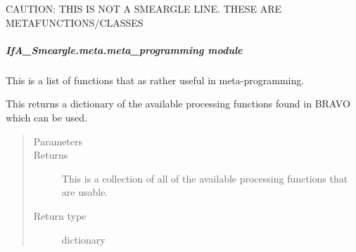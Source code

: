 \documentclass[letterpaper,10pt,english]{sphinxmanual}
\begin{document}
CAUTION: THIS IS NOT A SMEARGLE LINE. THESE ARE METAFUNCTIONS/CLASSES


\subparagraph{IfA\_Smeargle.meta.meta\_programming module}
\label{\detokenize{python_docstrings/IfA_Smeargle.meta.meta_programming:module-IfA_Smeargle.meta.meta_programming}}\label{\detokenize{python_docstrings/IfA_Smeargle.meta.meta_programming:ifa-smeargle-meta-meta-programming-module}}\label{\detokenize{python_docstrings/IfA_Smeargle.meta.meta_programming::doc}}
This is a list of functions that as rather useful in meta-programming.

\begin{fulllineitems}
\label{\detokenize{python_docstrings/IfA_Smeargle.meta.meta_programming:IfA_Smeargle.meta.meta_programming.smeargle_avaliable_bravo_processing_functions}}
This returns a dictionary of the available processing functions found
in BRAVO which can be used.
\begin{quote}\begin{description}
\item[{Parameters}] \leavevmode
{} \textendash{} 

\item[{Returns}] \leavevmode
{} \textendash{} This is a collection of all of the available processing functions that
are usable.

\item[{Return type}] \leavevmode
dictionary

\end{description}\end{quote}

\end{fulllineitems}

\end{document}
